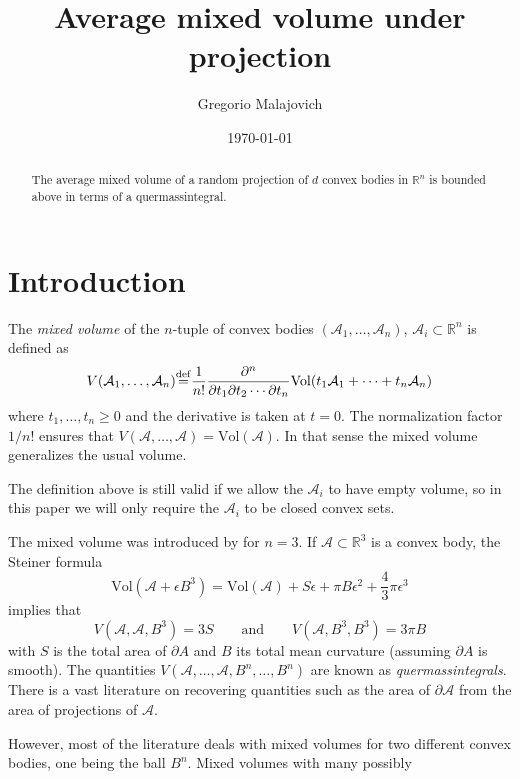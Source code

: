 \documentclass{amsart}
\author{Gregorio Malajovich}
\title{Average mixed volume under projection}
\date{\today}
\theoremstyle{definition}
\theoremstyle{remark}
\begin{document}
\maketitle
\begin{abstract}
The average mixed volume of a random projection of $d$ convex bodies in $\mathbb R^n$ is
bounded above in terms of a quermassintegral.
\end{abstract}

\section{Introduction}

The {\em mixed volume} of the $n$-tuple of convex bodies $(\mathcal A_1, \dots, \mathcal A_n)$,
$\mathcal A_i \subset \mathbb R^n$ is defined as
\[
V(\mathcal A_1, \dots, \mathcal A_n)
{\stackrel{\scriptsize\mathrm{def}}{=}}
\frac{1}{n!}
\frac{\partial^n}
{\partial t_1 \partial t_2 \cdots \partial t_n}
\mathrm{Vol}(t_1 \mathcal A_1 + \cdots + t_n \mathcal A_n) 
\]
where $t_1, \dots, t_n \ge 0$ and the derivative is taken at $t=0$. 
The normalization factor $1/n!$ ensures that $V(\mathcal A, \dots, \mathcal A) = {\mathrm{Vol}}(\mathcal A)$.
In that sense the mixed volume generalizes the usual volume.
\par
The definition above 
is still valid if we allow the $\mathcal A_i$ to have empty volume, so in this paper
we will only require the $\mathcal A_i$ to be closed convex sets.
\medskip
\par
The mixed volume was introduced by  for $n=3$. If
$\mathcal A \subset \mathbb R^3$ is a convex body, the Steiner
formula
\[
{\mathrm{Vol}}(\mathcal A + \epsilon B^3) =
{\mathrm{Vol}}(\mathcal A) 
+
S \epsilon 
+
\pi B \epsilon^2
+
\frac{4}{3} \pi \epsilon^3
\]
implies that 
\[
V(\mathcal A, \mathcal A, B^3) = 3S 
\hspace{2em}\text{and}\hspace{2em}
V(\mathcal A, B^3, B^3)= 3 \pi B
\] 
with $S$ is the total area of $\partial A$ and $B$ its total mean curvature
(assuming $\partial A$ is smooth).
The quantities $V(\mathcal A, \dots, \mathcal A, B^n, \dots, B^n)$ are known as {\em quermassintegrals}. There is a vast
literature on recovering quantities such as the area of $\partial \mathcal A$ from the area of projections
of $\mathcal A$.
\medskip
\par
However, most of the literature deals with mixed volumes for two different
convex bodies, one being the ball $B^n$. Mixed volumes with many possibly
\end{document}
